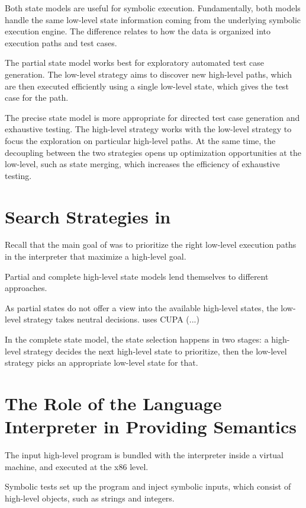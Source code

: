 Both state models are useful for symbolic execution.
%
Fundamentally, both models handle the same low-level state information coming from the underlying symbolic execution engine.  The difference relates to how the data is organized into execution paths and test cases.

The partial state model works best for exploratory automated test case generation.
%
The low-level strategy aims to discover new high-level paths, which are then executed efficiently using a single low-level state, which gives the test case for the path.

The precise state model is more appropriate for directed test case generation and exhaustive testing.
%
The high-level strategy works with the low-level strategy to focus the exploration on particular high-level paths.  At the same time, the decoupling between the two strategies opens up optimization opportunities at the low-level, such as state merging, which increases the efficiency of exhaustive testing.

\iffalse
\section{Search Strategies in \chef}

Recall that the main goal of \chef was to prioritize the right low-level execution paths in the interpreter that maximize a high-level goal.

Partial and complete high-level state models lend themselves to different approaches.

As partial states do not offer a view into the available high-level states, the low-level strategy takes neutral decisions.
%
\chef uses CUPA (...)

In the complete state model, the state selection happens in two stages: a high-level strategy decides the next high-level state to prioritize, then the low-level strategy picks an appropriate low-level state for that.


\section{The Role of the Language Interpreter in Providing Semantics}

The input high-level program is bundled with the interpreter inside a virtual machine, and executed at the x86 level.

Symbolic tests set up the program and inject symbolic inputs, which consist of high-level objects, such as strings and integers.

